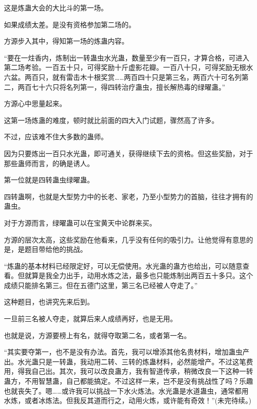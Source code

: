 \begin{this_body}
这是炼蛊大会的大比斗的第一场。

如果成绩太差。是没有资格参加第二场的。

方源步入其中，得知第一场的炼蛊内容。

“要在一炷香内，炼制出一转蛊虫水光蛊，数量至少有一百只，才算合格，可进入第二场考验。一百五十只，可得奖励十斤虚影花瓣。一百八十只，可得奖励无根水六盆。两百只，就有雷击木十根奖赏……两百四十只是第三名，两百六十可名列第二，两百七十六只将名列第一，得四转治疗蛊虫，擅长解热毒的绿曜蛊。”

方源心中思量起来。

这第一场炼蛊的难度，顿时就比前面的四大入门试题，骤然高了许多。

不过，应该难不住大多数的蛊师。

因为只要炼出一百只水光蛊，即可通关，获得继续下去的资格。但这些奖励，对于那些蛊师而言，的确是诱人。

第一位就是四转蛊虫绿曜蛊。

四转蛊啊，也就是大型势力中的长老、家老，乃至小型势力的首脑，往往才拥有的蛊虫。

对于方源而言，绿曜蛊可以在宝黄天中论群来买。

方源的层次太高，这些奖励在他看来，几乎没有任何的吸引力。让他觉得有意思的是，是题目带给他的挑战。

“炼蛊的基本材料已经限定好，可以无偿使用。水光蛊的蛊方也给出，可以随意查看。但就算是我全力出手，动用水炼之法，最多也只能炼制出两百五十多只。这个成绩只能排名第三。但在五德门这里，第三名已经被人夺走了。”

这种题目，也讲究先来后到。

一旦前三名被人夺走，就算后来人成绩再好，也是无用。

也就是说，方源要榜上有名，就得夺取第二名，或者第一名。

“其实要夺第一，也不是没有办法。首先，我可以增添其他名贵材料，增加蛊虫产出。水光蛊只是一转蛊，我动用二转、三转的炼蛊材料，必然能增产。不过这笔费用，得我自己出。其次，我可以改良蛊方，我有智道传承，稍微改良一下这种一转蛊方，不用智慧蛊，自己都能搞定。不过这样一来，岂不是没有挑战性了吗？乐趣也就丧失了。嗯……或许我可以挑战一下水火炼法。水光蛊是水道蛊虫，通常都用水炼，或者冰炼法。但我反其道而行之，动用火炼，或许能有奇效！”(未完待续。)

\end{this_body}

